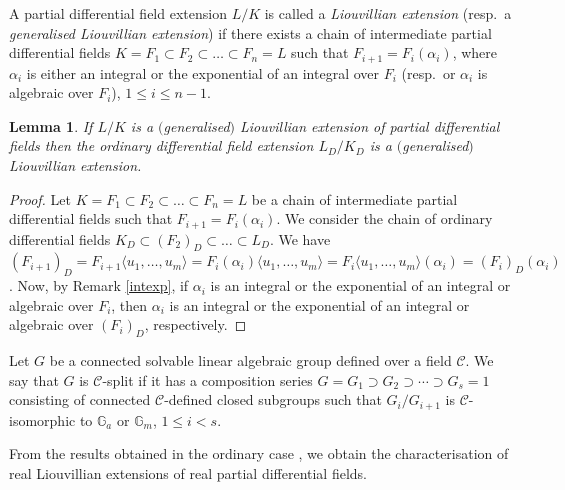 \documentclass[10pt,a4paper]{amsart}
\numberwithin{equation}{section}
\newtheorem{Lemma}[Theorem]{Lemma}
\newcommand{\G}{\mathbb{G}}
\begin{document}
\begin{Definition} A partial differential field extension $L/K$ is called a \emph{Liouvillian extension} (resp.\ a \emph{generalised Liouvillian extension}) if there exists a chain of intermediate partial differential fields $K=F_1 \subset F_2 \subset \dots \subset F_n =L$ such that $F_{i+1}=F_i(\alpha_i)$, where $\alpha_i$ is either an integral or the exponential of an integral over $F_i$ (resp.\ or $\alpha_i$ is algebraic over $F_i$), $1\leq i \leq n-1$.
\end{Definition}

\begin{Lemma}\label{Liou}
 If $L/K$ is a $($generalised$)$ Liouvillian extension of partial differential fields then the ordinary differential field extension $L_D/K_D$ is a $($generalised$)$ Liouvillian extension.
\end{Lemma}

\begin{proof}
 Let $K=F_1 \subset F_2 \subset \dots \subset F_n =L$ be a chain of intermediate partial differential fields such that $F_{i+1}=F_i(\alpha_i)$.
 We consider the chain of ordinary differential fields $K_D \subset (F_2)_D \subset \dots \subset L_D$. We have $(F_{i+1})_D=F_{i+1}\langle u_1,\dots,u_m \rangle=F_i(\alpha_i)\langle u_1,\dots,u_m \rangle=F_i\langle u_1,\dots,u_m \rangle(\alpha_i)=(F_i)_D(\alpha_i)$. Now, by Remark \ref{intexp}, if $\alpha_i$ is an integral or the exponential of an integral or algebraic over $F_i$, then $\alpha_i$ is an integral or the exponential of an integral or algebraic over $(F_i)_D$, respectively.
\end{proof}

\begin{Definition} Let $G$ be a connected solvable linear algebraic group defined over a field $\mathcal{C}$. We say that $G$ is $\mathcal{C}$-split if it has a composition series $G=G_1 \supset G_2 \supset \cdots \supset G_s = 1$ consisting of connected $\mathcal{C}$-defined closed subgroups such that $G_i/G_{i+1}$ is $\mathcal{C}$-isomorphic to $\G_a$ or $\G_m$, $1\leq i <s$.
\end{Definition}

From the results obtained in the ordinary case \cite[Section~3, Theorems~17 and~18]{CH}, we obtain the characterisation of real
Liouvillian extensions of real partial differential fields.
\end{document}

